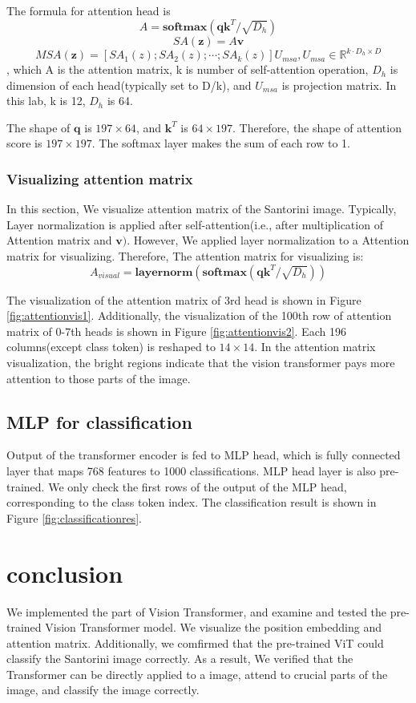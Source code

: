 \documentclass[extendedabs]{bmvc2k}
\begin{document}
The formula for attention head is
$$
A = \textbf{softmax}(\textbf{q}\textbf{k}^T / \sqrt{D_h})
$$
$$
SA(\textbf{z}) = A\textbf{v}
$$
$$
MSA(\textbf{z}) = [SA_1(z);SA_2(z);\cdots;SA_k(z)]U_{msa}, U_{msa}\in \mathbb{R}^{k\cdot D_h \times D}
$$
, which A is the attention matrix, k is number of self-attention operation, $D_h$ is dimension of each head(typically set to D/k), and $U_{msa}$ is projection matrix. In this lab, k is 12, $D_h$ is 64. 

The shape of $\textbf{q}$ is $197\times64$, and $\textbf{k}^T$ is $64\times197$. Therefore, the shape of attention score is $197\times197$. The softmax layer makes the sum of each row to 1.
\subsubsection{Visualizing attention matrix}
In this section, We visualize attention matrix of the Santorini image. Typically, Layer normalization is applied after self-attention(i.e., after multiplication of Attention matrix and $\textbf{v})$. However, We applied layer normalization to a Attention matrix for visualizing. Therefore, The attention matrix for visualizing is:
$$
A_{visual} = \textbf{layernorm}(\textbf{softmax}(\textbf{q}\textbf{k}^T / \sqrt{D_h}))
$$

The visualization of the attention matrix of 3rd head is shown in Figure \ref{fig:attentionvis1}. Additionally, the visualization of the 100th row of attention matrix of 0-7th heads is shown in Figure \ref{fig:attentionvis2}. Each 196 columns(except class token) is reshaped to $14\times14$. In the attention matrix visualization, the bright regions indicate that the vision transformer pays more attention to those parts of the image.

\subsection{MLP for classification}
Output of the transformer encoder is fed to MLP head, which is fully connected layer that maps 768 features to 1000 classifications. MLP head layer is also pre-trained. We only check the first rows of the output of the MLP head, corresponding to the class token index. The classification result is shown in Figure \ref{fig:classificationres}.

\section{conclusion}
We implemented the part of Vision Transformer\cite{vit}, and examine and tested the pre-trained Vision Transformer model. We visualize the position embedding and attention matrix. Additionally, we comfirmed that the pre-trained ViT could classify the Santorini image correctly. As a result, We verified that the Transformer\cite{transformer} can be directly applied to a image, attend to crucial parts of the image, and classify the image correctly.
\end{document}
